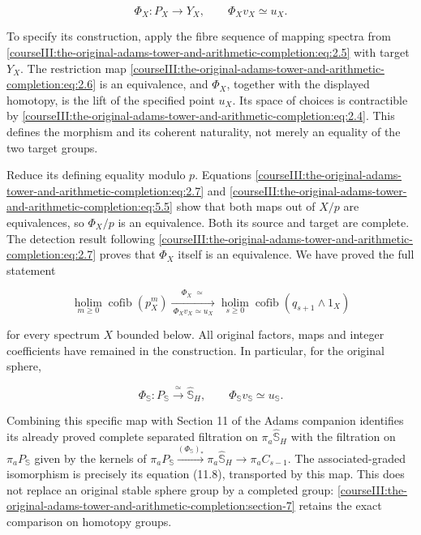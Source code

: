 \begin{equation}
\Phi_X:P_X\longrightarrow Y_X,
\qquad \Phi_Xv_X\simeq u_X.
\label{courseIII:the-original-adams-tower-and-arithmetic-completion:eq:5.6}
\end{equation}

To specify its construction, apply the fibre sequence of mapping spectra from \eqref{courseIII:the-original-adams-tower-and-arithmetic-completion:eq:2.5} with target \(Y_X\). The restriction map \eqref{courseIII:the-original-adams-tower-and-arithmetic-completion:eq:2.6} is an equivalence, and \(\Phi_X\), together with the displayed homotopy, is the lift of the specified point \(u_X\). Its space of choices is contractible by \eqref{courseIII:the-original-adams-tower-and-arithmetic-completion:eq:2.4}. This defines the morphism and its coherent naturality, not merely an equality of the two target groups.

Reduce its defining equality modulo \(p\). Equations \eqref{courseIII:the-original-adams-tower-and-arithmetic-completion:eq:2.7} and \eqref{courseIII:the-original-adams-tower-and-arithmetic-completion:eq:5.5} show that both maps out of \(X/p\) are equivalences, so \(\Phi_X/p\) is an equivalence. Both its source and target are complete. The detection result following \eqref{courseIII:the-original-adams-tower-and-arithmetic-completion:eq:2.7} proves that \(\Phi_X\) itself is an equivalence. We have proved the full statement

\begin{equation}
\boxed{
\operatorname*{holim}_{m\geq0}\operatorname{cofib}(p^m_X)
\xrightarrow[\ \Phi_Xv_X\simeq u_X\ ]{\ \Phi_X\;\simeq\ }
\operatorname*{holim}_{s\geq0}\operatorname{cofib}(q_{s+1}\wedge1_X)
}
\label{courseIII:the-original-adams-tower-and-arithmetic-completion:eq:5.7}
\end{equation}

for every spectrum \(X\) bounded below. All original factors, maps and integer coefficients have remained in the construction. In particular, for the original sphere,

\begin{equation}
\Phi_{\mathbb S}:P_{\mathbb S}\xrightarrow{\ \simeq\ }\widehat{\mathbb S}_H,
\qquad
\Phi_{\mathbb S}v_{\mathbb S}\simeq u_{\mathbb S}.
\label{courseIII:the-original-adams-tower-and-arithmetic-completion:eq:5.8}
\end{equation}

Combining this specific map with Section 11 of the Adams companion identifies its already proved complete separated filtration on \(\pi_a\widehat{\mathbb S}_H\) with the filtration on \(\pi_aP_{\mathbb S}\) given by the kernels of
\(\pi_aP_{\mathbb S}\xrightarrow{(\Phi_{\mathbb S})_*}\pi_a\widehat{\mathbb S}_H\to\pi_aC_{s-1}\).
The associated-graded isomorphism is precisely its equation (11.8), transported by this map. This does not replace an original stable sphere group by a completed group: \cref{courseIII:the-original-adams-tower-and-arithmetic-completion:section-7} retains the exact comparison on homotopy groups.

